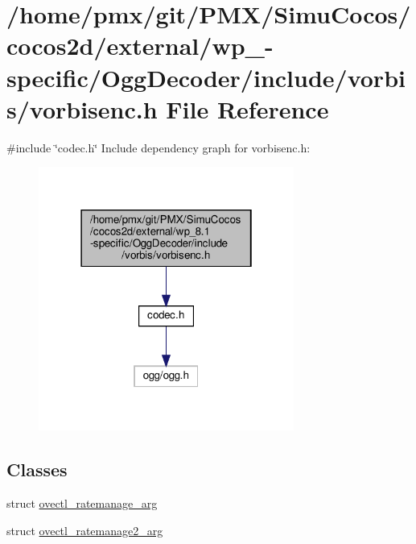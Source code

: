 \hypertarget{cocos2d_2external_2wp__8_81-specific_2OggDecoder_2include_2vorbis_2vorbisenc_8h}{}\section{/home/pmx/git/\+P\+M\+X/\+Simu\+Cocos/cocos2d/external/wp\+\_-\/specific/\+Ogg\+Decoder/include/vorbis/vorbisenc.h File Reference}
\label{cocos2d_2external_2wp__8_81-specific_2OggDecoder_2include_2vorbis_2vorbisenc_8h}
{\ttfamily \#include \char`\"{}codec.\+h\char`\"{}}\newline
Include dependency graph for vorbisenc.\+h\+:
\nopagebreak
\begin{figure}[H]
\begin{center}
\leavevmode
\includegraphics[width=238pt]{cocos2d_2external_2wp__8_81-specific_2OggDecoder_2include_2vorbis_2vorbisenc_8h__incl}
\end{center}
\end{figure}
\subsection*{Classes}
\begin{DoxyCompactItemize}
\item 
struct \hyperlink{structovectl__ratemanage__arg}{ovectl\+\_\+ratemanage\+\_\+arg}
\item 
struct \hyperlink{structovectl__ratemanage2__arg}{ovectl\+\_\+ratemanage2\+\_\+arg}
\end{DoxyCompactItemize}
